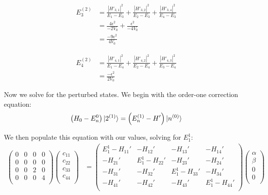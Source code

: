 \documentclass[10pt]{article} %
\begin{document}
\begin{align*}
  E_3^{(2)} &=
  \frac{|H'_{3,1}|^2}{E_1 - E_3} +
  \frac{|H'_{3,2}|^2}{E_2 - E_3} +
  \frac{|H'_{3,4}|^2}{E_4 - E_3}\\
  &= \frac{4\epsilon^2}{-2V_0} + \frac{\epsilon^2}{-4V_0}\\
  &= \frac{-9\epsilon^2}{4V_0}
\end{align*}

\begin{align*}
  E_4^{(2)} &=
  \frac{|H'_{4,1}|^2}{E_1 - E_4} +
  \frac{|H'_{4,2}|^2}{E_2 - E_4} +
  \frac{|H'_{4,3}|^2}{E_3 - E_4}\\
  &= \frac{-\epsilon^2}{2V_0}
\end{align*}

Now we solve for the perturbed states. We begin with the order-one correction equation:\\

\begin{align*}
  \left(H_0 - E_n^0\right)\ket{2^{(1)}} &= \left(E_n^{(1)} - H'\right)\ket{n^{(0)}}\\
\end{align*}

We then populate this equation with our values, solving for $E_1^1$:\\

\begin{align*}
  \begin{pmatrix}
    0 & 0 & 0 & 0\\
    0 & 0 & 0 & 0\\
    0 & 0 & 2 & 0\\
    0 & 0 & 0 & 4\\
  \end{pmatrix}
  \begin{pmatrix}
    c_{11}\\
    c_{22}\\
    c_{33}\\
    c_{44}\\
  \end{pmatrix}
  &=
  \begin{pmatrix}
    E_1^1 - H_{11}' & -H_{12}' & -H_{13}' & -H_{14}'\\
    -H_{21}' & E_1^1 - H_{22}' & -H_{23}' & -H_{24}'\\
    -H_{31}' & -H_{32}' & E_1^1 - H_{33}' & -H_{34}'\\
    -H_{41}' & -H_{42}' & -H_{43}' & E_1^1 - H_{44}'\\
  \end{pmatrix}
  \begin{pmatrix}
    \alpha\\
    \beta\\
    0\\
    0\\
  \end{pmatrix}
\end{align*}
\end{document}
